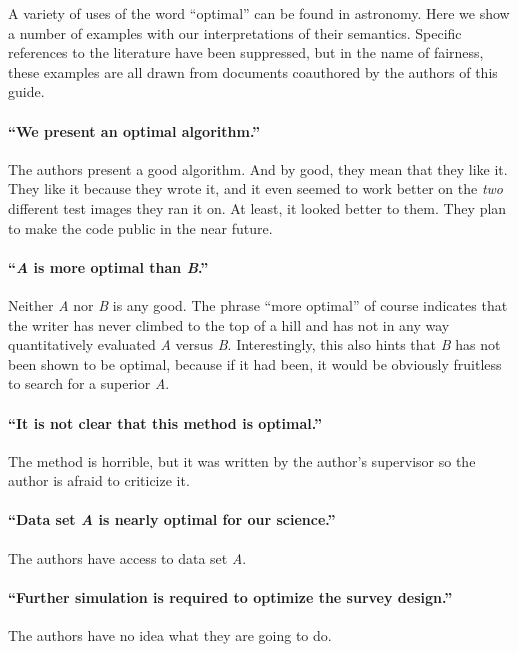 \documentclass[12pt, preprint]{aastex}
\begin{document}
A variety of uses of the word ``optimal'' can be found in astronomy.
Here we show a number of examples with our interpretations of their
semantics.
%
Specific references to the literature have been suppressed, but in the
name of fairness, these examples are all drawn from documents
coauthored by the authors of this guide.


\paragraph{``We present an optimal algorithm.''}
The authors present a good algorithm.  And by good, they
mean that they like it.  They like it because they wrote it, and it
even seemed to work better on the \emph{two} different test images
they ran it on.  At least, it looked better to them.  They plan
to make the code public in the near future.



\paragraph{``\emph{A} is more optimal than \emph{B}.''}
Neither \emph{A} nor \emph{B} is any good.  The phrase ``more
optimal'' of course indicates that the writer has never climbed to the
top of a hill and has not in any way quantitatively evaluated \emph{A}
versus \emph{B}.  Interestingly, this also hints that \emph{B} has not
been shown to be optimal, because if it had been, it would be
obviously fruitless to search for a superior \emph{A}.

\paragraph{``It is not clear that this method is optimal.''}
The method is horrible, but it was written by the author's supervisor
so the author is afraid to criticize it.


\paragraph{``Data set \emph{A} is nearly optimal for our science.''}
The authors have access to data set \emph{A}.


\paragraph{``Further simulation is required to optimize the survey design.''}
%
%
The authors have no idea what they are going to do.
\end{document}
